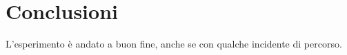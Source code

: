 \section{Conclusioni}

L'esperimento è andato a buon fine, anche se con qualche incidente di percorso.

